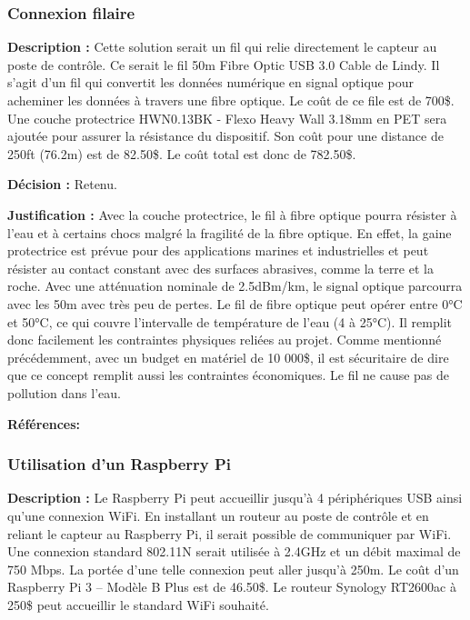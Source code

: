\subsubsection{Connexion filaire}
\textbf{Description :} Cette solution serait un fil qui relie directement le capteur au poste de contrôle. Ce serait le fil 50m Fibre Optic USB 3.0 Cable de Lindy. Il s'agit d'un fil qui convertit les données numérique en signal optique pour acheminer les données à travers une fibre optique. Le coût de ce file est de 700\$. Une couche protectrice HWN0.13BK - Flexo Heavy Wall 3.18mm en PET sera ajoutée pour assurer la résistance du dispositif. Son coût pour une distance de 250ft (76.2m) est de 82.50\$. Le coût total est donc de 782.50\$.
 
\textbf{Décision :} Retenu.
 
\textbf{Justification :} Avec la couche protectrice, le fil à fibre optique pourra résister à l'eau et à certains chocs malgré la fragilité de la fibre optique. En effet, la gaine protectrice est prévue pour des applications marines et industrielles et peut résister au contact constant avec des surfaces abrasives, comme la terre et la roche. Avec une atténuation nominale de 2.5dBm/km, le signal optique parcourra avec les 50m avec très peu de pertes. Le fil de fibre optique peut opérer entre 0°C et 50°C, ce qui couvre l'intervalle de température de l'eau (4 à 25°C). Il remplit donc facilement les contraintes physiques reliées au projet. Comme mentionné précédemment, avec un budget en matériel de 10 000\$, il est sécuritaire de dire que ce concept remplit aussi les contraintes économiques. Le fil ne cause pas de pollution dans l'eau.

\textbf{Références:} \cite{usb_50m} \cite{usb_standard_50m} \cite{Techflex}

\subsubsection{Utilisation d'un Raspberry Pi}
\textbf{Description :} Le Raspberry Pi peut accueillir jusqu'à 4 périphériques USB ainsi qu'une connexion WiFi. En installant un routeur au poste de contrôle et en reliant le capteur au Raspberry Pi, il serait possible de communiquer par WiFi. Une connexion standard 802.11N serait utilisée à 2.4GHz et un débit maximal de 750 Mbps. La portée d'une telle connexion peut aller jusqu'à 250m. Le coût d'un Raspberry Pi 3 – Modèle B Plus est de 46.50\$. Le routeur Synology RT2600ac à 250\$ peut accueillir le standard WiFi souhaité.

